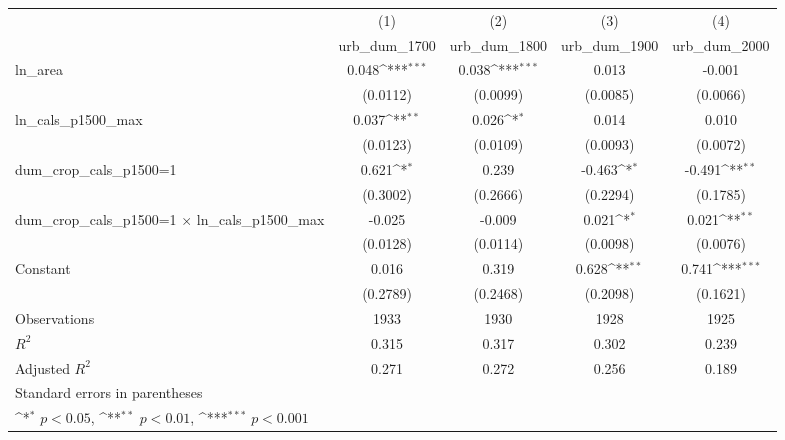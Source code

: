 {
\def\sym#1{\ifmmode^{#1}\else\(^{#1}\)\fi}
\begin{tabular}{l*{4}{c}}
\toprule
                    &\multicolumn{1}{c}{(1)}&\multicolumn{1}{c}{(2)}&\multicolumn{1}{c}{(3)}&\multicolumn{1}{c}{(4)}\\
                    &\multicolumn{1}{c}{urb\_dum\_1700}&\multicolumn{1}{c}{urb\_dum\_1800}&\multicolumn{1}{c}{urb\_dum\_1900}&\multicolumn{1}{c}{urb\_dum\_2000}\\
\midrule
ln\_area             &       0.048\sym{***}&       0.038\sym{***}&       0.013         &      -0.001         \\
                    &    (0.0112)         &    (0.0099)         &    (0.0085)         &    (0.0066)         \\
\addlinespace
ln\_cals\_p1500\_max   &       0.037\sym{**} &       0.026\sym{*}  &       0.014         &       0.010         \\
                    &    (0.0123)         &    (0.0109)         &    (0.0093)         &    (0.0072)         \\
\addlinespace
dum\_crop\_cals\_p1500=1&       0.621\sym{*}  &       0.239         &      -0.463\sym{*}  &      -0.491\sym{**} \\
                    &    (0.3002)         &    (0.2666)         &    (0.2294)         &    (0.1785)         \\
\addlinespace
dum\_crop\_cals\_p1500=1 $\times$ ln\_cals\_p1500\_max&      -0.025         &      -0.009         &       0.021\sym{*}  &       0.021\sym{**} \\
                    &    (0.0128)         &    (0.0114)         &    (0.0098)         &    (0.0076)         \\
\addlinespace
Constant            &       0.016         &       0.319         &       0.628\sym{**} &       0.741\sym{***}\\
                    &    (0.2789)         &    (0.2468)         &    (0.2098)         &    (0.1621)         \\
\midrule
Observations        &        1933         &        1930         &        1928         &        1925         \\
\(R^{2}\)           &       0.315         &       0.317         &       0.302         &       0.239         \\
Adjusted \(R^{2}\)  &       0.271         &       0.272         &       0.256         &       0.189         \\
\bottomrule
\multicolumn{5}{l}{\footnotesize Standard errors in parentheses}\\
\multicolumn{5}{l}{\footnotesize \sym{*} \(p<0.05\), \sym{**} \(p<0.01\), \sym{***} \(p<0.001\)}\\
\end{tabular}
}
